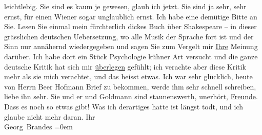 \begin{ledgroupsized}[t]{13cm}
               leichtlebig. Sie sind es kaum je gewesen, glaub ich jetzt. Sie sind ja sehr, sehr
               ernst, für einen Wiener sogar unglaublich ernst.\pend
           \pstart
           Ich habe eine demütige Bitte an Sie. Lesen Sie einmal mein fürchterlich dickes Buch über Shakespeare – in dieser grässlichen deutschen Uebersetzung, wo
               alle Musik der Sprache fort ist und der Sinn nur annähernd wiedergegeben und sagen
               Sie zum Vergelt mir \uline{Ihre} Meinung darüber. Ich habe
               dort ein Stück Psychologie kühner Art versucht und die ganze deutsche Kritik hat sich
               mir \uline{überlegen} gefühlt; ich verachte aber diese Kritik
               mehr als sie mich verachtet, und das heisst etwas.\pend
           \pstart
           Ich war sehr glücklich, heute von Herrn Beer
                  Hofmann Brief zu bekommen, werde ihm sehr schnell schreiben, liebe ihn sehr.
               Sie und er und Goldmann sind staunenswerth,
               unerhört, \uline{Freunde}. Dass es noch so etwas gibt! Was
               ich derartiges hatte ist längst todt, und ich glaube nicht mehr daran.\pend
           \pstart
           Ihr{\\[\baselineskip]}\spacefill\mbox{Georg Brandes}\pend
           \leftskip=0em{}\endnumbering{}\end{ledgroupsized}  \newcommand{\dateiname}{L00639}\newcommand{\titel}{Georg Brandes an Arthur Schnitzler, 16. 1. 1897}\newcommand{\editorInnen}{Martin Anton Müller und Gerd-Hermann Susen}
      